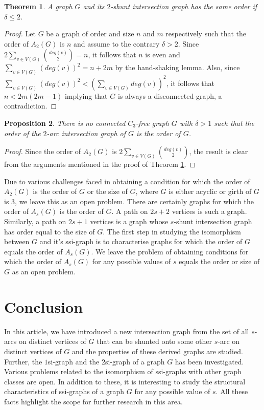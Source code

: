 \documentclass[12pt,a4paper,twoside]{article}
\newtheorem{theorem}{Theorem}[section]
\newtheorem{proposition}[theorem]{Proposition}
\theoremstyle{casesty}
\theoremstyle{subcasesty}
\theoremstyle{schemesty}
\begin{document}
\begin{theorem} \label{A2Iso}
	A graph $G$ and its $2$-shunt intersection graph has the same order if $\delta \leq 2$. 
\end{theorem}
\begin{proof}
	Let $G$ be a graph of order and size $n$ and $m$ respectively such that the order of $A_{2}(G)$ is $n$ and assume to the contrary $\delta > 2$. Since $2\sum\limits_{v \in V(G)} {deg(v) \choose 2}=n$, it follows that $n$ is even and $\sum\limits_{v \in V(G)} (deg(v))^2 = n + 2m$ by the hand-shaking lemma. Also, since $\sum\limits_{v \in V(G)} (deg(v))^2 < (\sum\limits_{v \in V(G)} deg(v))^2$, it follows that $n < 2m(2m-1)$ implying that $G$ is always a disconnected graph, a contradiction. 
\end{proof}

\begin{proposition}
	There is no connected $C_{3}$-free graph $G$ with $\delta > 1$ such that the order of the $2$-arc intersection graph of $G$ is the order of $G$.
\end{proposition}
\begin{proof}
	Since the order of $A_{2}(G)$ is $2\sum\limits_{v \in V(G)} {deg(v) \choose 2}$, the result is clear from the arguments mentioned in the proof of Theorem \ref{A2Iso}.
\end{proof}

Due to various challenges faced in obtaining a condition for which the order of $A_{2}(G)$ is the order of $G$ or the size of $G$, where $G$ is either acyclic or girth of $G$ is $3$, we leave this as an open problem. There are certainly graphs for which the order of $A_{s}(G)$ is the order of $G$. A path on $2s+2$ vertices is such a graph. Similarly, a path on $2s+1$ vertices is a graph whose $s$-shunt intersection graph has order equal to the size of $G$. The first step in studying the isomorphism between $G$ and it's ssi-graph is to characterise graphs for which the order of $G$ equals the order of $A_{s}(G)$. We leave the problem of obtaining conditions for which the order of $A_{s}(G)$ for any possible values of $s$ equals the order or size of $G$ as an open problem. 

\section{Conclusion}

In this article, we have introduced a new intersection graph from the set of all $s$-arcs on distinct vertices of $G$ that can be shunted onto some other $s$-arc on distinct vertices of $G$ and the properties of these derived graphs are studied. Further, the $1$si-graph and the $2$si-graph of a graph $G$ has been investigated. Various problems related to the isomorphism of ssi-graphs with other graph classes are open. In addition to these, it is interesting to study the structural characteristics of ssi-graphs of a graph $G$ for any possible value of $s$. All these facts highlight the scope for further research in this area.

%


\end{document}
